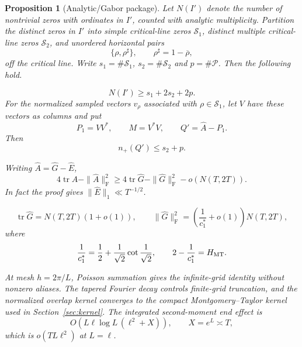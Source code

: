 \documentclass[11pt]{article}
\newtheorem{proposition}[theorem]{Proposition}
\DeclareMathOperator{\tr}{tr}
\newcommand{\Frob}{\mathrm F}
\newcommand{\cS}{\mathcal S}
\newcommand{\cP}{\mathcal P}
\begin{document}
\begin{proposition}[Analytic/Gabor package]\label{prop:analytic-package}
Let $N(I')$ denote the number of nontrivial zeros with ordinates in $I'$,
counted with analytic multiplicity.  Partition the distinct zeros in $I'$
into simple critical-line zeros $\cS_1$, distinct multiple critical-line
zeros $\cS_2$, and unordered horizontal pairs
\[
 \{\rho,\rho^\sharp\},\qquad \rho^\sharp=1-\overline\rho,
\]
off the critical line.  Write $s_1=\#\cS_1$, $s_2=\#\cS_2$ and
$p=\#\cP$.  Then the following hold.

\smallskip
{}
\begin{equation}\label{eq:Nlower}
 N(I')\ge s_1+2s_2+2p.
\end{equation}
For the normalized sampled vectors $v_\rho$ associated with
$\rho\in\cS_1$, let $V$ have these vectors as columns and put
\[
 P_1=VV^*,\qquad M=V^*V,\qquad Q'=\widehat A-P_1.
\]
Then
\begin{equation}\label{eq:index}
 n_+(Q')\le s_2+p.
\end{equation}

\smallskip
{}
Writing $\widehat A=\widehat G-\widehat E$,
\begin{equation}\label{eq:tail-input}
 4\tr\widehat A-\|\widehat A\|_{\Frob}^2
 \ge
 4\tr\widehat G-\|\widehat G\|_{\Frob}^2-o(N(T,2T)).
\end{equation}
In fact the proof gives $\|\widehat E\|_1\ll T^{-1/2}$.

\smallskip
{}
\begin{equation}\label{eq:TDmoments}
 \tr\widehat G=N(T,2T)(1+o(1)),\qquad
 \|\widehat G\|_{\Frob}^2=
 \left(\frac1{c_1^*}+o(1)\right)N(T,2T),
\end{equation}
where
\begin{equation}\label{eq:c1}
 \frac1{c_1^*}
 =
 \frac12+\frac1{\sqrt2}\cot\frac1{\sqrt2},
 \qquad
 2-\frac1{c_1^*}=H_{\rm MT}.
\end{equation}

\smallskip
{}
At mesh $h=2\pi/L$, Poisson summation gives the infinite-grid identity
without nonzero aliases.  The tapered Fourier decay controls finite-grid
truncation, and the normalized overlap kernel converges to the compact
Montgomery--Taylor kernel used in Section~\ref{sec:kernel}.  The integrated
second-moment end effect is
\[
 O\!\left(L\ell\log L\,(\ell^2+X)\right),
 \qquad X=e^L\asymp T,
\]
which is $o(TL\ell^2)$ at $L=\ell$.
\end{proposition}
\end{document}
